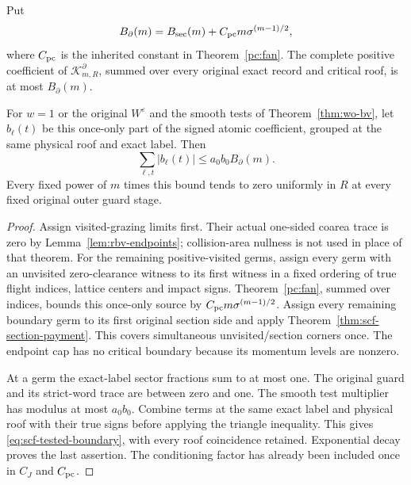 \begin{corollary}
\label{cor:scf-boundary-payment}
Put
\begin{equation}\label{eq:scf-Bboundary}
 B_\partial(m)=B_{\rm sec}(m)+C_{\rm pc}m\sigma^{(m-1)/2},
\end{equation}
where $C_{\rm pc}$ is the inherited constant in Theorem~\ref{pc:fan}.
The complete positive coefficient of $\mathcal K^\partial_{m,R}$,
summed over every original exact record and critical roof, is at
most $B_\partial(m)$.

For $w=1$ or the original $W^\varepsilon$ and the smooth tests of
Theorem~\ref{thm:wo-bv}, let $b_\ell(t)$ be this once-only part
of the signed atomic coefficient, grouped at the same physical
roof and exact label. Then
\begin{equation}\label{eq:scf-tested-boundary}
 \sum_{\ell,t}|b_\ell(t)|\le a_0b_0 B_\partial(m).
\end{equation}
Every fixed power of $m$ times this bound tends to zero uniformly
in $R$ at every fixed original outer guard stage.
\end{corollary}
\begin{proof}
Assign visited-grazing limits first. Their actual one-sided
coarea trace is zero by Lemma~\ref{lem:rbv-endpoints};
collision-area nullness is not used in place of that theorem.
For the remaining positive-visited germs, assign every germ with
an unvisited zero-clearance witness to its first witness in a
fixed ordering of true flight indices, lattice centers and impact
signs. Theorem~\ref{pc:fan}, summed over indices, bounds this
once-only source by $C_{\rm pc}m\sigma^{(m-1)/2}$.
Assign every remaining boundary germ to its first original
section side and apply Theorem~\ref{thm:scf-section-payment}.
This covers simultaneous unvisited/section corners once.
The endpoint cap has no critical boundary because its momentum
levels are nonzero.

At a germ the exact-label sector fractions sum to at most one.
The original guard and its strict-word trace are between zero
and one. The smooth test multiplier has modulus at most $a_0b_0$.
Combine terms at the same exact label and physical roof with
their true signs before applying the triangle inequality.
This gives \eqref{eq:scf-tested-boundary}, with every roof
coincidence retained. Exponential decay proves the last
assertion. The conditioning factor has already been included
once in $C_J$ and $C_{\rm pc}$.
\end{proof}

